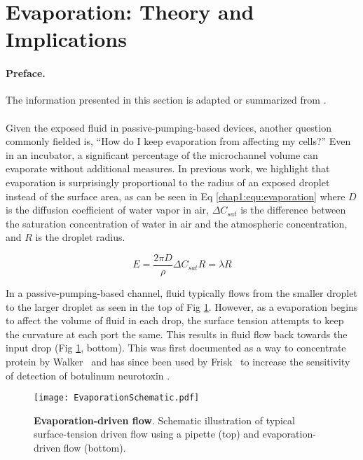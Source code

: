 
\section{Evaporation: Theory and Implications}
\paragraph{Preface.}The information presented in this section is adapted or summarized from \cite{Berthier:2008jf,Berthier:2008tl}.\\
\\
\noindent Given the exposed fluid in passive-pumping-based devices, another question commonly fielded is, ``How do I keep evaporation from affecting my cells?'' Even in an incubator, a significant percentage of the microchannel volume can evaporate without additional measures. In previous work, we highlight that evaporation is surprisingly proportional to the radius of an exposed droplet instead of the surface area, as can be seen in Eq \ref{chap1:equ:evaporation} where $D$ is the diffusion coefficient of water vapor in air, $\Delta C_{sat}$ is the difference between the saturation concentration of water in air and the atmospheric concentration, and $R$ is the droplet radius.

\begin{equation}
E = \frac{2 \pi D}{\rho} \Delta C_{sat} R = \lambda R 
\label{chap1:equ:evaporation}
\end{equation}

In a passive-pumping-based channel, fluid typically flows from the smaller droplet to the larger droplet as seen in the top of Fig \ref{chap1:fig:evaporationSchematic}. However, as a evaporation begins to affect the volume of fluid in each drop, the surface tension attempts to keep the curvature at each port the same. This results in fluid flow back towards the input drop (Fig \ref{chap1:fig:evaporationSchematic}, bottom). This was first documented as a way to concentrate protein by Walker \etal\ and has since been used by Frisk \etal\ to increase the sensitivity of detection of botulinum neurotoxin \cite{Walker:2002oy,Frisk:2008pi}.

\begin{figure}[!ht]
\centering
\texttt{[image: EvaporationSchematic.pdf]}
\caption{\textbf{Evaporation-driven flow}. Schematic illustration of typical surface-tension driven flow using a pipette (top) and evaporation-driven flow (bottom).}
\label{chap1:fig:evaporationSchematic}
\end{figure}


